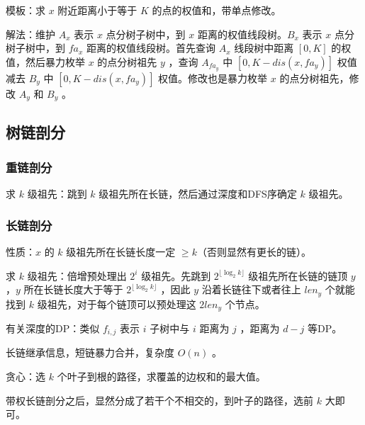 \vspace{0.2cm}

模板：求 $x$ 附近距离小于等于 $K$ 的点的权值和，带单点修改。


\vspace{0.1cm}

解法：维护 $A_x$ 表示 $x$ 点分树子树中，到 $x$ 距离的权值线段树。$B_x$ 表示 $x$ 点分树子树中，到 $fa_x$ 距离的权值线段树。首先查询 $A_x$ 线段树中距离 $[0,K]$ 的权值，然后暴力枚举 $x$ 的点分树祖先 $y$ ，查询 $A_{fa_y}$ 中 $[0,K-dis(x,fa_y)]$ 权值减去 $B_y$ 中 $[0,K-dis(x,fa_y)]$ 权值。修改也是暴力枚举 $x$ 的点分树祖先，修改 $A_y$ 和 $B_y$ 。



\subsection{树链剖分}

\subsubsection{重链剖分}

求 $k$ 级祖先：跳到 $k$ 级祖先所在长链，然后通过深度和DFS序确定 $k$ 级祖先。

\subsubsection{长链剖分}

性质：$x$ 的 $k$ 级祖先所在长链长度一定 $\ge k$（否则显然有更长的链）。

\vspace{0.1cm}

求 $k$ 级祖先：倍增预处理出 $2^i$ 级祖先。先跳到 $2^{\lfloor\log_2k\rfloor}$ 级祖先所在长链的链顶 $y$ ，$y$ 所在长链长度大于等于 $2^{\lfloor\log_2k\rfloor}$ ，因此 $y$ 沿着长链往下或者往上 $len_y$ 个就能找到 $k$ 级祖先，对于每个链顶可以预处理这 $2len_y$ 个节点。

\vspace{0.2cm}

有关深度的DP：类似 $f_{i,j}$ 表示 $i$ 子树中与 $i$ 距离为 $j$ ，距离为 $d-j$ 等DP。

长链继承信息，短链暴力合并，复杂度 $O(n)$ 。

\vspace{0.1cm}

贪心：选 $k$ 个叶子到根的路径，求覆盖的边权和的最大值。

带权长链剖分之后，显然分成了若干个不相交的，到叶子的路径，选前 $k$ 大即可。

